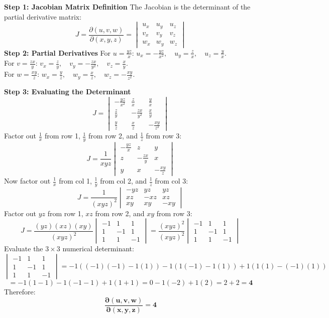 \begin{solutionbox}
\textbf{Step 1: Jacobian Matrix Definition}
The Jacobian is the determinant of the partial derivative matrix:
\[
J = \frac{\partial(u,v,w)}{\partial(x,y,z)} = \begin{vmatrix}
u_x & u_y & u_z \\
v_x & v_y & v_z \\
w_x & w_y & w_z
\end{vmatrix}
\]
\textbf{Step 2: Partial Derivatives}
For $u = \frac{yz}{x}$: $u_x = -\frac{yz}{x^2}, \quad u_y = \frac{z}{x}, \quad u_z = \frac{y}{x}$.\\
For $v = \frac{zx}{y}$: $v_x = \frac{z}{y}, \quad v_y = -\frac{zx}{y^2}, \quad v_z = \frac{x}{y}$.\\
For $w = \frac{xy}{z}$: $w_x = \frac{y}{z}, \quad w_y = \frac{x}{z}, \quad w_z = -\frac{xy}{z^2}$.

\textbf{Step 3: Evaluating the Determinant}
\[
J = \begin{vmatrix}
-\frac{yz}{x^2} & \frac{z}{x} & \frac{y}{x} \\
\frac{z}{y} & -\frac{zx}{y^2} & \frac{x}{y} \\
\frac{y}{z} & \frac{x}{z} & -\frac{xy}{z^2}
\end{vmatrix}
\]
Factor out $\frac{1}{x}$ from row 1, $\frac{1}{y}$ from row 2, and $\frac{1}{z}$ from row 3:
\[
J = \frac{1}{xyz} \begin{vmatrix}
-\frac{yz}{x} & z & y \\
z & -\frac{zx}{y} & x \\
y & x & -\frac{xy}{z}
\end{vmatrix}
\]
Now factor out $\frac{1}{x}$ from col 1, $\frac{1}{y}$ from col 2, and $\frac{1}{z}$ from col 3:
\[
J = \frac{1}{(xyz)^2} \begin{vmatrix}
-yz & yz & yz \\
xz & -xz & xz \\
xy & xy & -xy
\end{vmatrix}
\]
Factor out $yz$ from row 1, $xz$ from row 2, and $xy$ from row 3:
\[
J = \frac{(yz)(xz)(xy)}{(xyz)^2} \begin{vmatrix}
-1 & 1 & 1 \\
1 & -1 & 1 \\
1 & 1 & -1
\end{vmatrix}
= \frac{(xyz)^2}{(xyz)^2} \begin{vmatrix}
-1 & 1 & 1 \\
1 & -1 & 1 \\
1 & 1 & -1
\end{vmatrix}
\]
Evaluate the $3\times 3$ numerical determinant:
\[
\begin{vmatrix}
-1 & 1 & 1 \\
1 & -1 & 1 \\
1 & 1 & -1
\end{vmatrix}
= -1((-1)(-1) - 1(1)) - 1(1(-1) - 1(1)) + 1(1(1) - (-1)(1))
\]
\[
= -1(1 - 1) - 1(-1 - 1) + 1(1 + 1) = 0 - 1(-2) + 1(2) = 2 + 2 = \mathbf{4}
\]
Therefore:
\[
\mathbf{\frac{\partial(u,v,w)}{\partial(x,y,z)} = 4}
\]


\end{solutionbox}
